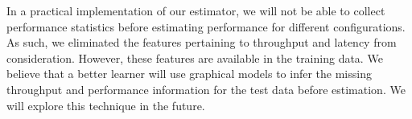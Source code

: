 In a practical implementation of our estimator, we will not be able
to collect performance statistics before estimating performance for
different configurations. As such, we eliminated the features
pertaining to throughput and latency from consideration. However,
these features are available in the training data. We believe that a
better learner will use graphical models to infer the missing
throughput and performance information for the test data before
estimation. We will explore this technique in the future.